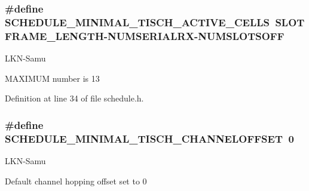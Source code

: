 \subsubsection[{\texorpdfstring{S\+C\+H\+E\+D\+U\+L\+E\+\_\+\+M\+I\+N\+I\+M\+A\+L\+\_\+6\+T\+I\+S\+C\+H\+\_\+\+A\+C\+T\+I\+V\+E\+\_\+\+C\+E\+L\+LS}{SCHEDULE_MINIMAL_6TISCH_ACTIVE_CELLS}}]{\setlength{\rightskip}{0pt plus 5cm}\#define S\+C\+H\+E\+D\+U\+L\+E\+\_\+\+M\+I\+N\+I\+M\+A\+L\+\_\+T\+I\+S\+C\+H\+\_\+\+A\+C\+T\+I\+V\+E\+\_\+\+C\+E\+L\+LS~{\bf S\+L\+O\+T\+F\+R\+A\+M\+E\+\_\+\+L\+E\+N\+G\+TH}-\/{\bf N\+U\+M\+S\+E\+R\+I\+A\+L\+RX}-\/{\bf N\+U\+M\+S\+L\+O\+T\+S\+O\+FF}}\hypertarget{group___schedule_ga299d7e29eb70888b68ace83fd3f1a8df}{}\label{group___schedule_ga299d7e29eb70888b68ace83fd3f1a8df}
\begin{DoxyRefDesc}{L\+K\+N-\/\+Samu}
\item[\hyperlink{_l_k_n_code_edits__LKN_code_edits000008}{L\+K\+N-\/\+Samu}]M\+A\+X\+I\+M\+UM number is 13 \end{DoxyRefDesc}


Definition at line 34 of file schedule.\+h.

\subsubsection[{\texorpdfstring{S\+C\+H\+E\+D\+U\+L\+E\+\_\+\+M\+I\+N\+I\+M\+A\+L\+\_\+6\+T\+I\+S\+C\+H\+\_\+\+C\+H\+A\+N\+N\+E\+L\+O\+F\+F\+S\+ET}{SCHEDULE_MINIMAL_6TISCH_CHANNELOFFSET}}]{\setlength{\rightskip}{0pt plus 5cm}\#define S\+C\+H\+E\+D\+U\+L\+E\+\_\+\+M\+I\+N\+I\+M\+A\+L\+\_\+T\+I\+S\+C\+H\+\_\+\+C\+H\+A\+N\+N\+E\+L\+O\+F\+F\+S\+ET~0}\hypertarget{group___schedule_ga485a603a3e03059901c4fc5fc968a1e9}{}\label{group___schedule_ga485a603a3e03059901c4fc5fc968a1e9}
\begin{DoxyRefDesc}{L\+K\+N-\/\+Samu}
\item[\hyperlink{_l_k_n_code_edits__LKN_code_edits000010}{L\+K\+N-\/\+Samu}]Default channel hopping offset set to 0 \end{DoxyRefDesc}



